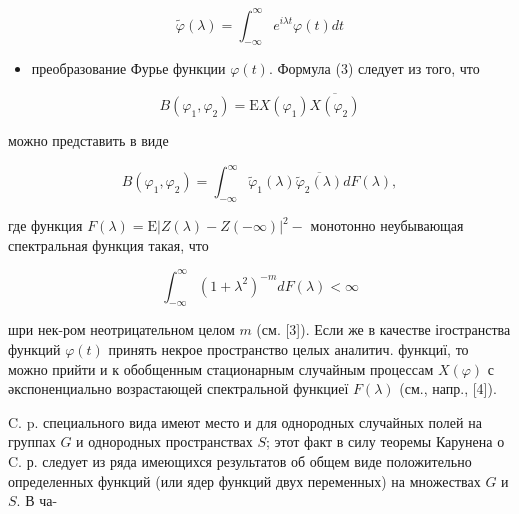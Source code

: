 \documentclass[10pt]{article}
\begin{document}
\[

\tilde{\varphi}(\lambda)=\int_{-\infty}^{\infty} e^{i \lambda t} \varphi(t) d t

\]



\begin{itemize}

  \item преобразование Фурье функции $\varphi(t)$. Формула (3) следует из того, что

\end{itemize}



\[

B\left(\varphi_{1}, \varphi_{2}\right)=\mathrm{E} X\left(\varphi_{1}\right) \overline{X\left(\varphi_{2}\right)}

\]



можно представить в виде



\[

B\left(\varphi_{1}, \varphi_{2}\right)=\int_{-\infty}^{\infty} \tilde{\varphi}_{1}(\lambda) \overline{\tilde{\varphi}_{2}(\lambda)} d F(\lambda),

\]



где функция $F(\lambda)=\mathrm{E}|Z(\lambda)-Z(-\infty)|^{2}-$ монотонно неубывающая спектральная функция такая, что



\[

\int_{-\infty}^{\infty}\left(1+\lambda^{2}\right)^{-m} d F(\lambda)<\infty

\]



шри нек-ром неотрицательном целом $m$ (см. [3]). Если же в качестве ігостранства функций $\varphi(t)$ принять некрое пространство целых аналитич. функциї, то можно прийти и к обобщенным стационарным случайным процессам $X(\varphi)$ с әкспоненциально возрастающей спектральной функциеї $F(\lambda)$ (см., напр., [4]).



C. p. специального вида имеют место и для однородных случайных полей на группах $G$ и однородных пространствах $S$; этот факт в силу теоремы Карунена о C. р. следует из ряда имеющихся результатов об общем виде положительно определенных функций (или ядер функций двух переменных) на множествах $G$ и $S$. В ча-
\end{document}
